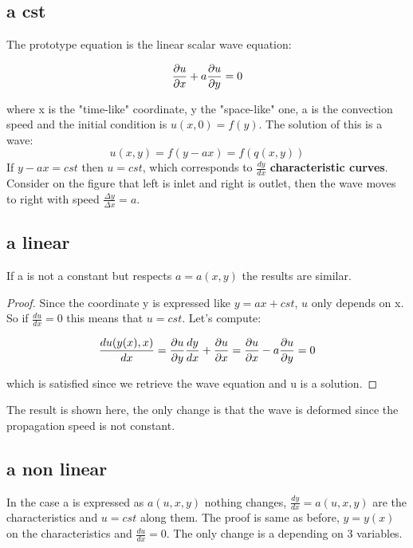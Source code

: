 \subsection{a cst}	
	The prototype equation is the linear scalar wave equation: 
	
	\begin{equation}
	\frac{\D u}{\D x} + a \frac{\D u}{\D y} = 0
	\end{equation}
	
	where x is the "time-like" coordinate, y the "space-like" one, a is the convection speed and the initial condition is $u(x,0) = f(y)$. The solution of this is a wave: 
	\begin{equation}
	u(x,y) = f(y-ax) = f(q(x,y))
	\end{equation}
	If $y-ax = cst$ then $u= cst$, which corresponds to $\frac{dy}{dx}$ \textbf{characteristic curves}. Consider on the figure that left is inlet and right is outlet, then the wave moves to right with speed $\frac{\Delta y}{\Delta x} = a$. 
	
\subsection{a linear}
	If a is not a constant but respects $a = a(x,y)$ the results are similar. 
	
	\begin{proof}
	Since the coordinate y is expressed like $y = ax + cst$, $u$ only depends on x. So if $\frac{du}{dx} = 0$ this means that $u = cst$. Let's compute: 
	
	\begin{equation}
	\frac{du(y(x),x)}{dx} = \frac{\D u}{\D y} \frac{d y}{dx} + \frac{\D u}{\D x} = \frac{\D u}{\D x} -a \frac{\D u}{\D y} = 0
	\end{equation}
	
	which is satisfied since we retrieve the wave equation and u is a solution. 
	\end{proof}
	
	The result is shown here, the only change is that the wave is deformed since the propagation speed is not constant. 
	
	\subsection{a non linear}
	In the case a is expressed as $a(u,x,y)$ nothing changes, $\frac{dy}{dx} = a(u,x,y)$ are the characteristics and $u = cst$ along them. The proof is same as before, $y = y(x)$ on the characteristics and $\frac{du}{dx} = 0$. The only change is a depending on 3 variables.  
	
